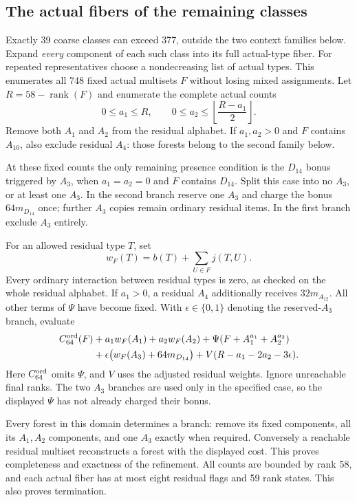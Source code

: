 \documentclass[11pt]{article}
\theoremstyle{remark}\newtheorem{remark}[theorem]{Remark}
\begin{document}
\subsection{The actual fibers of the remaining classes}

Exactly 39 coarse classes can exceed 377, outside the two context
families below. Expand \emph{every} component of each such class
into its full actual-type fiber. For repeated representatives
choose a nondecreasing list of actual types. This enumerates all
748 fixed actual multisets $F$ without losing mixed assignments.
Let $R=58-\operatorname{rank}(F)$ and enumerate the complete actual
counts
\[
 0\le a_1\le R,\qquad
 0\le a_2\le\left\lfloor\frac{R-a_1}{2}\right\rfloor.
\]
Remove both $A_1$ and $A_2$ from the residual alphabet. If
$a_1,a_2>0$ and $F$ contains $A_{10}$, also exclude residual
$A_4$: those forests belong to the second family below.

At these fixed counts the only remaining presence condition is
the $D_{14}$ bonus triggered by $A_3$, when $a_1=a_2=0$ and $F$
contains $D_{14}$. Split this case into no $A_3$, or at least one
$A_3$. In the second branch reserve one $A_3$ and charge the bonus
$64m_{D_{14}}$ once; further $A_3$ copies remain ordinary residual
items. In the first branch exclude $A_3$ entirely.

For an allowed residual type $T$, set
\[
 w_F(T)=b(T)+\sum_{U\in F}j(T,U).
\]
Every ordinary interaction between residual types is zero, as
checked on the whole residual alphabet. If $a_1>0$, a residual
$A_4$ additionally receives $32m_{A_{12}}$. All other terms of
$\Psi$ have become fixed. With $\epsilon\in\{0,1\}$ denoting the
reserved-$A_3$ branch, evaluate
\begin{align*}
 C^{\rm ord}_{64}(F)&+a_1w_F(A_1)+a_2w_F(A_2)
       +\Psi(F+A_1^{a_1}+A_2^{a_2})\\
 &+\epsilon\bigl(w_F(A_3)+64m_{D_{14}}\bigr)
       +V(R-a_1-2a_2-3\epsilon).
\end{align*}
Here $C^{\rm ord}_{64}$ omits $\Psi$, and $V$ uses the adjusted
residual weights. Ignore unreachable final ranks. The two $A_3$
branches are used only in the specified case, so the displayed
$\Psi$ has not already charged their bonus.

Every forest in this domain determines a branch: remove its
fixed components, all its $A_1,A_2$ components, and one $A_3$
exactly when required. Conversely a reachable residual multiset
reconstructs a forest with the displayed cost. This proves
completeness and exactness of the refinement. All counts are
bounded by rank 58, and each actual fiber has at most eight
residual flags and 59 rank states. This also proves termination.
\end{document}
